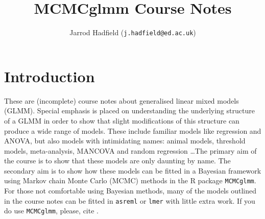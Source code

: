\documentclass[oneside]{book}
\title{\Large MCMCglmm Course Notes}
\author{\Large Jarrod Hadfield (\texttt{j.hadfield@ed.ac.uk})}
\begin{document}
\maketitle

\chapter*{Introduction}

These are (incomplete) course notes about generalised linear mixed models (GLMM). Special emphasis is placed on understanding the underlying structure of a GLMM in order to show that slight modifications of this structure can produce a wide range of models.  These include familiar models like regression and ANOVA, but also models with intimidating names: animal models, threshold models, meta-analysis, MANCOVA and random regression \dots The primary aim of the course is to show that these models are only daunting by name. The secondary aim is to show how these models can be fitted in a Bayesian framework using Markov chain Monte Carlo (MCMC) methods in the R package \texttt{MCMCglmm}. For those not comfortable using Bayesian methods, many of the models outlined in the course notes can be fitted in \texttt{asreml} or \texttt{lmer} with little extra work. If you do use \texttt{MCMCglmm}, please, cite \citet{Hadfield.2010c}.\\

\tableofcontents


\end{document}
